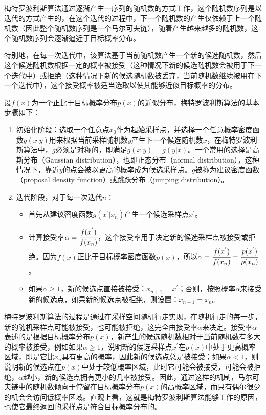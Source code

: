 梅特罗波利斯算法通过逐渐产生一序列的随机数的方式工作，这个随机数序列是以迭代的方式产生的，在这个迭代的过程中，下一个随机数的产生仅依赖于上一个随机数（因此整个随机数序列是一个马尔可夫链），随着产生越来越多的随机数，这个随机数序列会逐渐逼近于目标概率分布。

特别地，在每一次迭代中，该算法基于当前随机数产生一个新的候选随机数，然后这个候选随机数根据一定的概率被接受（这种情况下新的候选随机数会被用于下一个迭代中）或拒绝（这种情况下新的候选随机数被丢弃，当前随机数继续被用在下一个迭代中），这个接受概率被适当选取以使其能够近似目标概率的分布。

设$f(x)$为一个正比于目标概率分布$p(x)$的近似分布，梅特罗波利斯算法的基本步骤如下：

\begin{enumerate}
	\item 初始化阶段：选取一个任意点$x_0$作为起始采样点，并选择一个任意概率密度函数$g(x|y)$用来根据当前采样随机数$y$产生下一个候选随机数$x$，在梅特罗波利斯算法中，$g$必须是对称的，即满足$g(x|y)=g(y|x)$。一个常用的选择是高斯分布（Gaussian distribution），也即正态分布（normal distribution），这种情况下，靠近$y$的点会被以更高的概率成为候选采样点。$g$被称为建议密度函数（proposal density function）或跳跃分布（jumping distribution）。
	\item 迭代阶段，对于每一次迭代$n$：
	\begin{itemize}
		\item 首先从建议密度函数$g(x^{'}|x_n)$产生一个候选采样点$x^{'}$。
		\item 计算接受率$\alpha= \cfrac{f(x^{'})}{f(x_n)}$，这个接受率用于决定新的候选采样点被接受或拒绝。因为$f(x)$正比于目标概率密度函数$p(x)$，所以$\alpha= \cfrac{f(x^{'})}{f(x_n)}= \cfrac{p(x^{'})}{p(x_n)}$。
		\item 如果$\alpha\geq 1$，新的候选点直接被接受：$x_{n+1}=x^{'}$；否则，按照概率$\alpha$来接受新的候选点，如果新的候选点被拒绝，则设置：$x_{n+1}=x_n$。
	\end{itemize}
\end{enumerate}

梅特罗波利斯算法的过程是通过在采样空间随机行走实现，在随机行走的每一步，新的随机采样点可能被接受，也可能被拒绝，这完全由接受率$\alpha$来决定。接受率$\alpha$表述的是根据目标概率分布$p(x)$，新产生的候选随机数相对于当前随机数有多大的概率被接受，例如如果$\alpha\geq 1$，说明新的候选采样点$x^{'}$在$p(x)$中处于更高概率区域，即是它比$x_n$具有更高的概率，因此新的候选点总是被接受；如果$\alpha<1$，则说明新的候选点在$p(x)$中处于较低概率区域，此时它可能会被接受，可能会被拒绝，$\alpha$越小，新的候选点拥有更小的几率被接受。因此，通过这样的机制，马尔可夫链中的随机数倾向于停留在目标概率分布$p(x)$的高概率区域，而只有偶尔很少的机会会访问低概率区域。直观上看，这就是梅特罗波利斯算法能够工作的原因，也使它最终返回的采样点是符合目标概率分布的。





